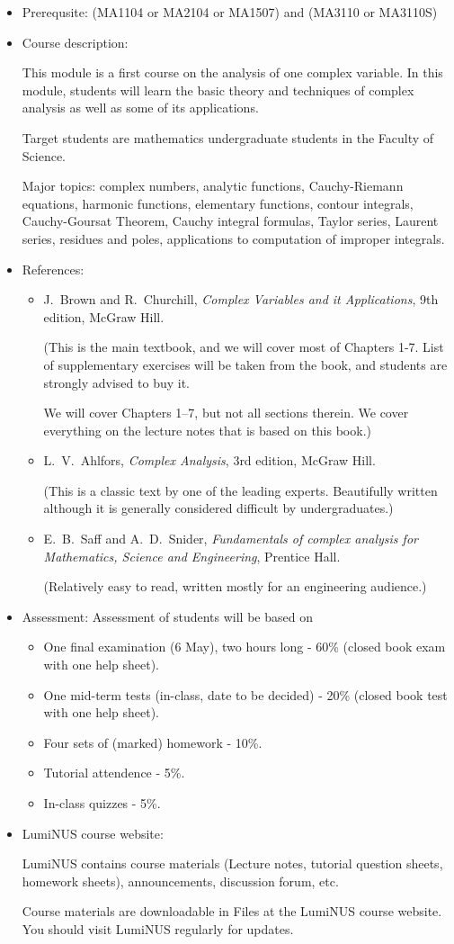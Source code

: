 \documentclass[a4paper]{article}
\begin{document}
\begin{itemize}
\item Prerequsite: (MA1104 or MA2104 or MA1507) and (MA3110 or MA3110S)
  
\item Course description:
  
  This module is a first course on the analysis of one complex variable. In this module, students will learn the basic theory and techniques of complex analysis as well as some of its applications.
  
  Target students are mathematics undergraduate students in the Faculty of Science.

  Major topics: complex numbers, analytic functions, Cauchy-Riemann equations, harmonic functions, elementary functions, contour integrals, Cauchy-Goursat Theorem, Cauchy integral formulas, Taylor series, Laurent series, residues and poles, applications to computation of improper
integrals.
  
\item References:
  \begin{itemize}
  \item 
    J.~Brown and R.~Churchill, \emph{Complex Variables and it Applications}, 9th edition, McGraw Hill.
    
    (This is the main textbook, and we will cover most of Chapters 1-7.  List of supplementary exercises will be taken from the book, and students are strongly advised to buy it.

    We will cover Chapters 1--7, but not all sections therein. We cover everything on the lecture notes that is based on this book.)
  \item 
    L.~V.~Ahlfors, \emph{Complex Analysis}, 3rd edition, McGraw Hill.

    (This is a classic text by one of the leading experts. Beautifully written although it is generally considered difficult by undergraduates.)
  \item
    E.~B.~Saff and A.~D.~Snider, \emph{Fundamentals of complex analysis for Mathematics, Science and Engineering}, Prentice Hall.
    
    (Relatively easy to read, written mostly for an engineering audience.)
  \end{itemize}
\item Assessment:
  Assessment of students will be based on
  \begin{itemize}
  \item
    One final examination (6 May), two hours long - 60\% (closed book exam with one help sheet).
  \item 
    One mid-term tests (in-class, date to be decided) - 20\% (closed book test with one help sheet).
  \item 
    Four sets of (marked) homework - 10\%.
  \item 
    Tutorial attendence - 5\%.
  \item
    In-class quizzes - 5\%.
  \end{itemize}
\item
  LumiNUS course website:

  LumiNUS contains course materials (Lecture notes, tutorial question sheets, homework sheets), announcements, discussion forum, etc.

  Course materials are downloadable in Files at the LumiNUS course website. You should visit LumiNUS regularly for updates.
\end{itemize}
\end{document}
